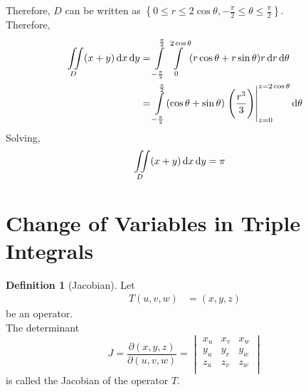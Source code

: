 \documentclass[fleqn, a4paper, 12pt, twoside]{article}
\theoremstyle{definition}
\newtheorem{definition}{Definition}
\theoremstyle{theorem}
\begin{document}
{\begin{solution}
\begin{figure}[H]
	\end{figure}
	Therefore, $D$ can be written as $\left\{ 0 \le r \le 2 \cos \theta , -\frac{\pi}{2} \le \theta \le \frac{\pi}{2} \right\}$.\\
	Therefore,
	\begin{align*}
		\iint\limits_{D} (x + y) \dif x \dif y & = \int\limits_{-\frac{\pi}{2}}^{\frac{\pi}{2}} \int\limits_{0}^{2 \cos \theta} (r \cos \theta + r \sin \theta) r \dif r \dif \theta \\
                                                       & = \int\limits_{-\frac{\pi}{2}}^{\frac{\pi}{2}} (\cos \theta + \sin \theta) \left. \left( \frac{r^3}{3} \right) \right|_{z = 0}^{z = 2 \cos \theta} \dif \theta
	\end{align*}
	Solving,
	\begin{align*}
		\iint\limits_{D} (x + y) \dif x \dif y & = \pi
	\end{align*}
\end{solution}

\section{Change of Variables in Triple Integrals}

\begin{definition}[Jacobian]
	Let
	\begin{align*}
		T(u,v,w) & = (x,y,z)
	\end{align*}
	be an operator.\\
	The determinant
	\begin{equation*}
		J = \frac{\partial(x,y,z)}{\partial(u,v,w)} =
			\begin{vmatrix}
				x_u & x_v & x_w \\
				y_u & y_v & y_w \\
				z_u & z_v & z_w \\
			\end{vmatrix}
	\end{equation*}
	is called the Jacobian of the operator $T$.
\end{definition}

}
\end{document}
